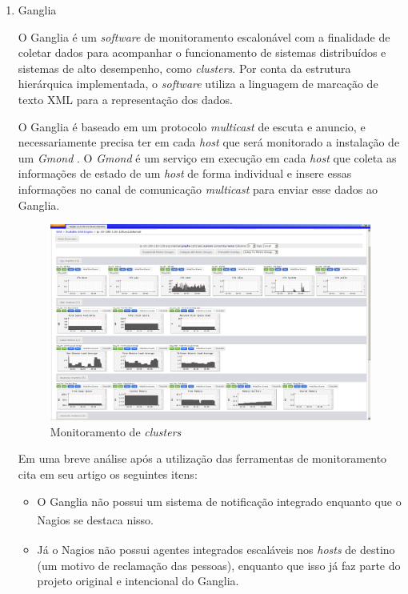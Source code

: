 \begin{enumerate}
\item Ganglia

 O Ganglia é um \textit{software} de monitoramento escalonável com a finalidade de coletar dados para acompanhar o funcionamento de sistemas distribuídos e sistemas de alto desempenho, como \textit{clusters}. Por conta da estrutura hierárquica implementada, o \textit{software} utiliza a linguagem de marcação de texto XML para a representação dos dados. 
 
 O Ganglia é baseado em um protocolo \textit{multicast} de escuta e anuncio, e necessariamente precisa ter em cada \textit{host} que será monitorado a instalação de um \textit{Gmond} \cite{vyas2014embedding}. O \textit{Gmond} é um serviço em execução em cada \textit{host} que coleta as informações de estado de um \textit{host} de forma individual e insere essas informações no canal de comunicação \textit{multicast} para enviar esse dados ao Ganglia.
 
 \begin{figure}[h!]
	\begin{center}
	\includegraphics[scale = 0.50]{img/1024px-ScalableGridEngineGanglia2.png}
		\caption{Monitoramento de \textit{clusters} \cite{Ganglia}}
		\label{fun:fig:ganglia}
	\end{center}
\end{figure}
 
 
 Em uma breve análise após a utilização das ferramentas de monitoramento \cite{benincosa2ganglia} cita em seu artigo os seguintes itens:
\begin{itemize}

\item O Ganglia não possui um sistema de notificação integrado enquanto que o Nagios\textsuperscript{\textregistered} se destaca nisso.
\item Já o Nagios\textsuperscript{\textregistered} não possui agentes integrados escaláveis nos \textit{hosts} de destino (um motivo de reclamação das pessoas), enquanto que isso já faz parte do projeto original e intencional do Ganglia.


\end{itemize}
\end{enumerate}
